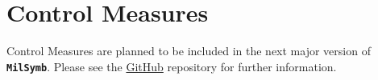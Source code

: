 \documentclass[a4paper, titlepage]{article}
\newcommand\MilSymb{\textbf{\texttt{MilSymb}}}
\begin{document}
\section{Control Measures}

Control Measures are planned to be included in the next major version of \MilSymb. Please see the \href{https://github.com/ralphieraccoon/MilSymb}{GitHub} repository for further information.
\end{document}
